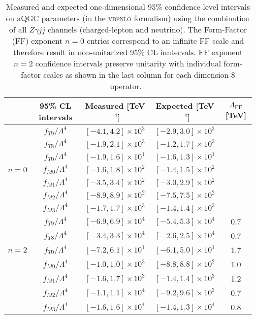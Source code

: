 \documentclass[10pt]{article}
\begin{document}
\begin{table}
\small
\begin{center}
\begin{tabular}{ccccc}
        \hline
              & 95\% CL intervals  & Measured [TeV$^{-4}$] & Expected [TeV$^{-4}$] & $\Lambda_{\mathrm{FF}}$ [TeV] \\ \hline
\multirow{7}{*}{$n=0$} & $f_{T9}/\Lambda^4$ & $[-4.1, 4.2]\times10^3$  & $[-2.9, 3.0]\times10^3$ & \\
              & $f_{T8}/\Lambda^4$ & $[-1.9, 2.1]\times10^3$  & $[-1.2, 1.7]\times10^3$ &  \\
              & $f_{T0}/\Lambda^4$ & $[-1.9, 1.6]\times10^1$  & $[-1.6, 1.3]\times10^1$ & \\
              & $f_{M0}/\Lambda^4$ & $[-1.6, 1.8]\times10^2$  & $[-1.4, 1.5]\times10^2$ & \\
              & $f_{M1}/\Lambda^4$ & $[-3.5, 3.4]\times10^2$  & $[-3.0, 2.9]\times10^2$ & \\
              & $f_{M2}/\Lambda^4$ & $[-8.9, 8.9]\times10^2$  & $[-7.5, 7.5]\times10^2$ & \\
              & $f_{M3}/\Lambda^4$ & $[-1.7, 1.7]\times10^3$  & $[-1.4, 1.4]\times10^3$ & \\ \hline
\multirow{5}{*}{$n=2$} & $f_{T9}/\Lambda^4$ & $[-6.9, 6.9]\times10^4$  & $[-5.4, 5.3]\times10^4$ & 0.7\\
              & $f_{T8}/\Lambda^4$ & $[-3.4, 3.3]\times10^4$  & $[-2.6, 2.5]\times10^4$ & 0.7 \\
              & $f_{T0}/\Lambda^4$ & $[-7.2, 6.1]\times10^1$  & $[-6.1, 5.0]\times10^1$ & 1.7 \\
              & $f_{M0}/\Lambda^4$ & $[-1.0, 1.0]\times10^3$  & $[-8.8, 8.8]\times10^2$ & 1.0\\
              & $f_{M1}/\Lambda^4$ & $[-1.6, 1.7]\times10^3$  & $[-1.4, 1.4]\times10^3$ & 1.2 \\
              & $f_{M2}/\Lambda^4$ & $[-1.1, 1.1]\times10^4$  & $[-9.2, 9.6]\times10^3$ & 0.7 \\
              & $f_{M3}/\Lambda^4$ & $[-1.6, 1.6]\times10^4$  & $[-1.4, 1.3]\times10^4$ & 0.8 \\ \hline
\end{tabular}
\caption{Measured and expected one-dimensional 95\% confidence level intervals
  on aQGC parameters (in the \textsc{vbfnlo} formalism)
  using the combination of all $Z\gamma jj$ channels (charged-lepton and neutrino).
  The Form-Factor (FF) exponent $n=0$ entries correspond to an infinite FF scale and therefore result in
  non-unitarized 95\% CL inntervals. FF exponent $n=2$ confidence intervals preserve unitarity with individual form-factor
  scales as shown in the last column for each dimension-8 operator.~\cite{jhep:ZyVBS_ATLAS, bib:ZyNLO}}
\end{center}
\label{tab:observedExpected1DLimitsAQGC_comb}
\end{table}
\end{document}

